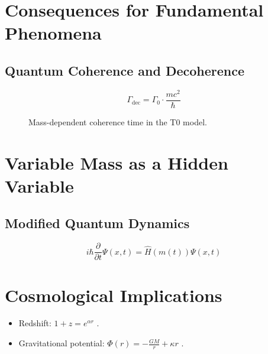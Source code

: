 \documentclass[12pt,a4paper]{article}
\begin{document}
	\section{Consequences for Fundamental Phenomena}
	\subsection{Quantum Coherence and Decoherence}
	\begin{equation}
		\Gamma_{\text{dec}} = \Gamma_0 \cdot \frac{mc^2}{\hbar}
	\end{equation}
	
	\begin{figure}[h]
		\centering
		\caption{Mass-dependent coherence time in the T0 model.}
	\end{figure}
	
	\section{Variable Mass as a Hidden Variable}
	\subsection{Modified Quantum Dynamics}
	\begin{equation}
		i\hbar \frac{\partial}{\partial t}\Psi(x,t) = \hat{H}(m(t))\Psi(x,t)
	\end{equation}
	
	\section{Cosmological Implications}
	\begin{itemize}
		\item Redshift: \(1 + z = e^{\alpha r}\) \cite{pascher_wesentl_2025}.
		\item Gravitational potential: \(\Phi(r) = -\frac{GM}{r} + \kappa r\) \cite{pascher_wesentl_2025}.
	\end{itemize}
	
\end{document}
